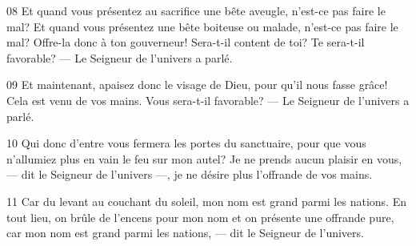 
08 Et quand vous présentez au sacrifice une bête aveugle, n’est-ce pas faire le mal? Et quand vous présentez une bête boiteuse ou malade, n’est-ce pas faire le mal? Offre-la donc à ton gouverneur! Sera-t-il content de toi? Te sera-t-il favorable? --- Le Seigneur de l’univers a parlé.

09 Et maintenant, apaisez donc le visage de Dieu, pour qu’il nous fasse grâce! Cela est venu de vos mains. Vous sera-t-il favorable? --- Le Seigneur de l’univers a parlé.

10 Qui donc d’entre vous fermera les portes du sanctuaire, pour que vous n’allumiez plus en vain le feu sur mon autel? Je ne prends aucun plaisir en vous, --- dit le Seigneur de l’univers ---, je ne désire plus l’offrande de vos mains.

11 Car du levant au couchant du soleil, mon nom est grand parmi les nations. En tout lieu, on brûle de l’encens pour mon nom et on présente une offrande pure, car mon nom est grand parmi les nations, --- dit le Seigneur de l’univers.